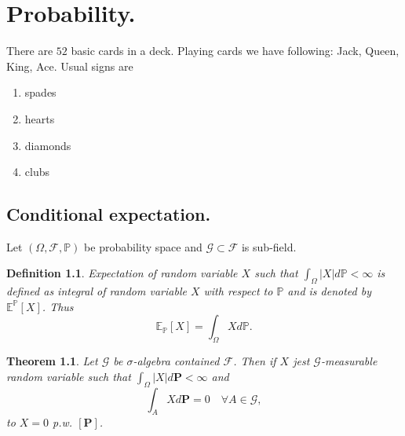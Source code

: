 \documentclass{book}
\newtheorem{definition}{Definition}[section]
\newtheorem{theorem}{Theorem}[section]
\begin{document}
\chapter{Probability.}
There are $52$ basic cards in a deck. Playing cards we have following: Jack, Queen, King, Ace. Usual signs are
\begin{enumerate}
\item spades
\item hearts
\item diamonds
\item clubs
\end{enumerate}
\section{Conditional expectation.}
Let $(\varOmega,\mathcal{F},\mathbb{P})$ be probability space and $\mathcal{G}\subset\mathcal{F}$ is sub-field.
\begin{definition}
Expectation of random variable $X$ such that $\int_{\varOmega}|X|d\mathbb{P}<\infty$ is defined as integral of random variable $X$ with respect to $\mathbb{P}$ and is denoted by $\mathbb{E}^{\mathbb{P}}[X]$. Thus
\begin{equation}
\nonumber
\mathbb{E}_{\mathbb{P}}[X]=\int_{\varOmega}Xd\mathbb{P}. 
\end{equation}
\end{definition}
\begin{theorem}
Let $\mathcal{G}$ be $\sigma$-algebra contained $\mathcal{F}$. Then if $X$ jest $\mathcal{G}$-measurable random variable such that $\int_{\varOmega}|X|d\mathbf{P}<\infty$ and
\begin{equation}
\nonumber
\int_{A}Xd\mathbf{P}=0\quad \forall A\in\mathcal{G},
\end{equation}
to $X=0$ p.w. $[\mathbf{P}]$.
\end{theorem}
\end{document}
